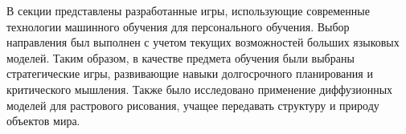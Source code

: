 В секции представлены разработанные игры, использующие современные технологии машинного обучения для 
персонального обучения. Выбор направления был выполнен с учетом текущих возможностей больших языковых моделей. 
Таким образом, в качестве предмета обучения были выбраны стратегические игры,
развивающие навыки долгосрочного планирования и критического мышления. Также 
было исследовано применение диффузионных моделей для растрового рисования, учащее передавать 
структуру и природу объектов мира.


